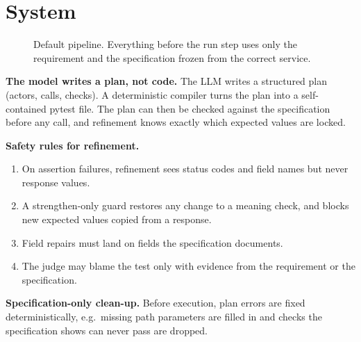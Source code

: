 \documentclass[11pt,a4paper]{article}
\begin{document}
\section{System}
\begin{figure}[H]\centering
{}
\caption{Default pipeline. Everything before the run step uses only the requirement and the specification frozen from the correct service.}
\end{figure}

\textbf{The model writes a plan, not code.} The LLM writes a structured plan (actors, calls, checks). A deterministic compiler turns the plan into a self-contained pytest file. The plan can then be checked against the specification before any call, and refinement knows exactly which expected values are locked.

\textbf{Safety rules for refinement.}
\begin{enumerate}[label=(\arabic*)]
\item On assertion failures, refinement sees status codes and field names but never response values.
\item A strengthen-only guard restores any change to a meaning check, and blocks new expected values copied from a response.
\item Field repairs must land on fields the specification documents.
\item The judge may blame the test only with evidence from the requirement or the specification.
\end{enumerate}
\textbf{Specification-only clean-up.} Before execution, plan errors are fixed deterministically, e.g.\ missing path parameters are filled in and checks the specification shows can never pass are dropped.
\end{document}
